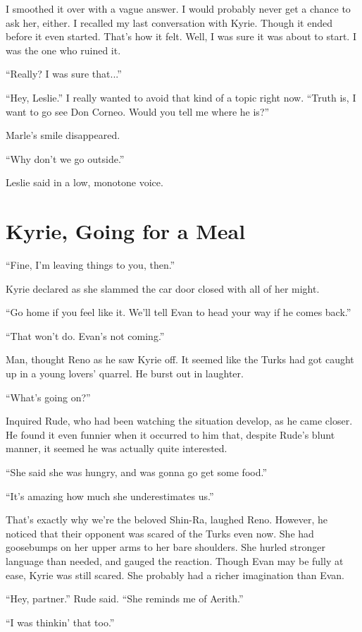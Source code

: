 \documentclass[oneside]{book}
\begin{document}
I smoothed it over with a vague answer. I would probably never get a chance to ask her, either. I recalled my last conversation with Kyrie. Though it ended before it even started. That’s how it felt. Well, I was sure it was about to start. I was the one who ruined it.

“Really? I was sure that...”

“Hey, Leslie.” I really wanted to avoid that kind of a topic right now. “Truth is, I want to go see Don Corneo. Would you tell me where he is?”

Marle’s smile disappeared.

“Why don’t we go outside.”

Leslie said in a low, monotone voice.

\chapter{Kyrie, Going for a Meal}

“Fine, I’m leaving things to you, then.”

Kyrie declared as she slammed the car door closed with all of her might.

“Go home if you feel like it. We’ll tell Evan to head your way if he comes back.”

“That won’t do. Evan’s not coming.”

Man, thought Reno as he saw Kyrie off. It seemed like the Turks had got caught up in a young lovers’ quarrel. He burst out in laughter.

“What’s going on?”

Inquired Rude, who had been watching the situation develop, as he came closer. He found it even funnier when it occurred to him that, despite Rude’s blunt manner, it seemed he was actually quite interested.

“She said she was hungry, and was gonna go get some food.”

“It’s amazing how much she underestimates us.”

That’s exactly why we’re the beloved Shin-Ra, laughed Reno. However, he noticed that their opponent was scared of the Turks even now. She had goosebumps on her upper arms to her bare shoulders. She hurled stronger language than needed, and gauged the reaction. Though Evan may be fully at ease, Kyrie was still scared. She probably had a richer imagination than Evan.

“Hey, partner.” Rude said. “She reminds me of Aerith.”

“I was thinkin’ that too.”
\end{document}
